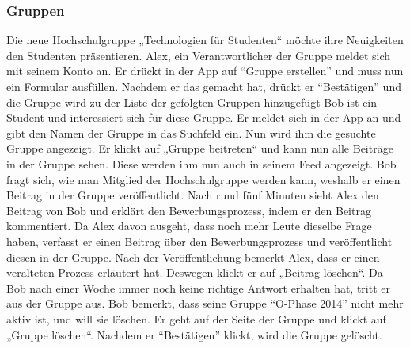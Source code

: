 \documentclass[parskip=full]{scrartcl}
\begin{document}
	\subsubsection{Gruppen}
	Die neue Hochschulgruppe „Technologien für Studenten“ möchte ihre Neuigkeiten den Studenten präsentieren. Alex, ein Verantwortlicher der Gruppe meldet sich mit seinem Konto an. Er drückt in der App auf “Gruppe erstellen” und muss nun ein Formular ausfüllen. Nachdem er das gemacht hat, drückt er “Bestätigen” und die Gruppe wird zu der Liste der gefolgten Gruppen hinzugefügt %
	Bob ist ein Student und interessiert sich für diese Gruppe. Er meldet sich in der App an und gibt den Namen der Gruppe in das Suchfeld ein. Nun wird ihm die gesuchte Gruppe angezeigt. Er klickt auf „Gruppe beitreten“ und kann nun alle Beiträge in der Gruppe sehen. Diese werden ihm nun auch in seinem Feed angezeigt. Bob fragt sich, wie man Mitglied der Hochschulgruppe werden kann, weshalb er einen Beitrag in der Gruppe veröffentlicht. Nach rund fünf Minuten sieht Alex den Beitrag von Bob und erklärt den Bewerbungsprozess, indem er den Beitrag kommentiert. Da Alex davon ausgeht, dass noch mehr Leute dieselbe Frage haben, verfasst er einen Beitrag über den Bewerbungsprozess und veröffentlicht diesen in der Gruppe. Nach der Veröffentlichung bemerkt Alex, dass er einen veralteten Prozess erläutert hat. Deswegen klickt er auf „Beitrag löschen“.
	Da Bob nach einer Woche immer noch keine richtige Antwort erhalten hat, tritt er aus der Gruppe aus.
	Bob bemerkt, dass seine Gruppe “O-Phase 2014” nicht mehr aktiv ist, und will sie löschen. Er geht auf der Seite der Gruppe und klickt auf „Gruppe löschen“. Nachdem er “Bestätigen” klickt, wird die Gruppe gelöscht.
\end{document}
